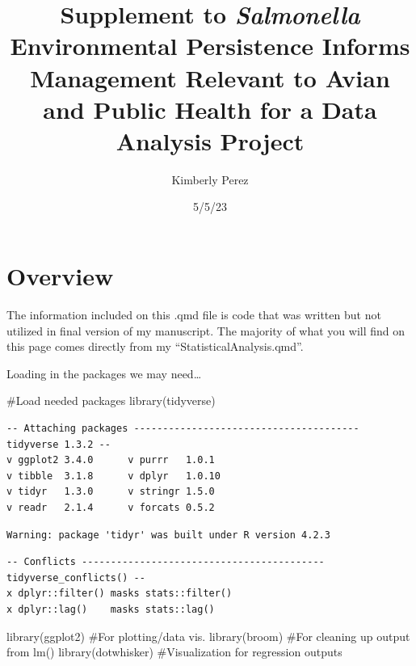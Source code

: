 \documentclass[
  letterpaper,
  DIV=11,
  numbers=noendperiod]{scrartcl}
\title{Supplement to \emph{Salmonella} Environmental Persistence Informs
Management Relevant to Avian and Public Health for a Data Analysis
Project}
\author{Kimberly Perez}
\date{5/5/23}
\newenvironment{Shaded}{}{}
\newcommand{\CommentTok}[1]{\textcolor[rgb]{0.42,0.45,0.49}{#1}}
\newcommand{\FunctionTok}[1]{\textcolor[rgb]{0.44,0.26,0.76}{#1}}
\newcommand{\NormalTok}[1]{\textcolor[rgb]{0.14,0.16,0.18}{#1}}
\begin{document}
\maketitle
\ifdefined\Shaded\renewenvironment{Shaded}{\begin{tcolorbox}[breakable, boxrule=0pt, borderline west={3pt}{0pt}{shadecolor}, enhanced, interior hidden, frame hidden, sharp corners]}{\end{tcolorbox}}\fi

\hypertarget{overview}{%
\section{\texorpdfstring{\textbf{Overview}}{Overview}}\label{overview}}

The information included on this .qmd file is code that was written but
not utilized in final version of my manuscript. The majority of what you
will find on this page comes directly from my
``StatisticalAnalysis.qmd''.

Loading in the packages we may need\ldots{}

\begin{Shaded}
\begin{Highlighting}[]
\CommentTok{\#Load needed packages}
\FunctionTok{library}\NormalTok{(tidyverse)}
\end{Highlighting}
\end{Shaded}

\begin{verbatim}
-- Attaching packages --------------------------------------- tidyverse 1.3.2 --
v ggplot2 3.4.0      v purrr   1.0.1 
v tibble  3.1.8      v dplyr   1.0.10
v tidyr   1.3.0      v stringr 1.5.0 
v readr   2.1.4      v forcats 0.5.2 
\end{verbatim}

\begin{verbatim}
Warning: package 'tidyr' was built under R version 4.2.3
\end{verbatim}

\begin{verbatim}
-- Conflicts ------------------------------------------ tidyverse_conflicts() --
x dplyr::filter() masks stats::filter()
x dplyr::lag()    masks stats::lag()
\end{verbatim}

\begin{Shaded}
\begin{Highlighting}[]
\FunctionTok{library}\NormalTok{(ggplot2) }\CommentTok{\#For plotting/data vis.}
\FunctionTok{library}\NormalTok{(broom) }\CommentTok{\#For cleaning up output from lm()}
\FunctionTok{library}\NormalTok{(dotwhisker) }\CommentTok{\#Visualization for regression outputs}
\end{Highlighting}
\end{Shaded}
\end{document}
